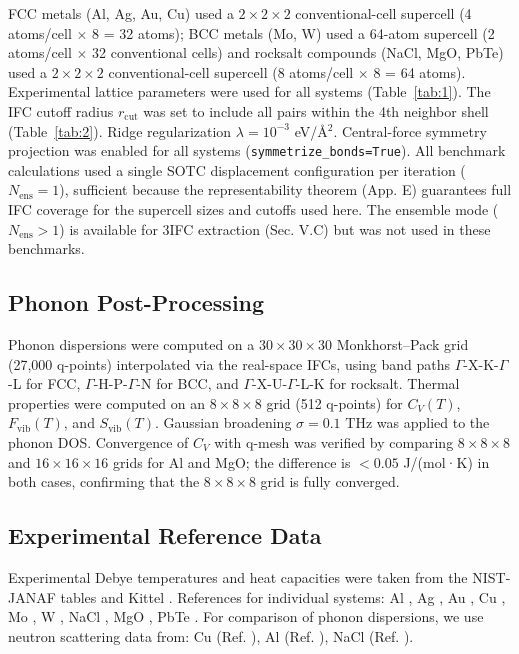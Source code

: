 \documentclass[aps,prb,reprint,amsmath,amssymb,floatfix]{revtex4-2}
\begin{document}
FCC metals (Al, Ag, Au, Cu) used a \(2\times2\times2\) conventional-cell
supercell (4 atoms/cell \(\times\) 8 = 32 atoms); BCC metals (Mo, W)
used a 64-atom supercell (2 atoms/cell \(\times\) 32 conventional cells)
and rocksalt compounds (NaCl, MgO, PbTe) used a \(2\times2\times2\)
conventional-cell supercell (8 atoms/cell \(\times\) 8 = 64 atoms).
Experimental lattice parameters were used for all systems (Table~\ref{tab:1}). The
IFC cutoff radius \(r_\text{cut}\) was set to include all pairs within
the 4th neighbor shell (Table~\ref{tab:2}). Ridge regularization
\(\lambda = 10^{-3}\) eV/Å\(^2\). Central-force symmetry projection was
enabled for all systems (\texttt{symmetrize\_bonds=True}). All benchmark
calculations used a single SOTC displacement configuration per iteration
(\(N_\text{ens} = 1\)), sufficient because the representability theorem
(App. E) guarantees full IFC coverage for the supercell sizes and
cutoffs used here. The ensemble mode (\(N_\text{ens} > 1\)) is available
for 3IFC extraction (Sec. V.C) but was not used in these benchmarks.

\subsection{Phonon Post-Processing}\label{phonon-post-processing}

Phonon dispersions were computed on a \(30\times30\times30\)
Monkhorst--Pack grid (27,000 q-points) interpolated via the real-space
IFCs, using band paths \(\Gamma\)-X-K-\(\Gamma\)-L for FCC,
\(\Gamma\)-H-P-\(\Gamma\)-N for BCC, and \(\Gamma\)-X-U-\(\Gamma\)-L-K
for rocksalt. Thermal properties were computed on an \(8\times8\times8\)
grid (512 q-points) for \(C_V(T)\), \(F_\text{vib}(T)\), and
\(S_\text{vib}(T)\). Gaussian broadening \(\sigma = 0.1\) THz was
applied to the phonon DOS. Convergence of \(C_V\) with q-mesh was
verified by comparing \(8\times8\times8\) and \(16\times16\times16\)
grids for Al and MgO; the difference is \(< 0.05\) J/(mol·K) in both
cases, confirming that the \(8\times8\times8\) grid is fully converged.

\subsection{Experimental Reference
Data}\label{experimental-reference-data}

Experimental Debye temperatures and heat capacities were taken from the
NIST-JANAF tables \cite{ref20} and Kittel \cite{ref21}. References for
individual systems: Al \cite{ref22,ref23}, Ag \cite{ref23}, Au
\cite{ref24}, Cu \cite{ref25}, Mo \cite{ref26,ref27}, W \cite{ref27},
NaCl \cite{ref28}, MgO \cite{ref29,ref30}, PbTe \cite{ref31,ref32}. For
comparison of phonon dispersions, we use neutron scattering data from:
Cu (Ref. \cite{ref33}), Al (Ref. \cite{ref34}), NaCl (Ref.
\cite{ref35}).
\end{document}
